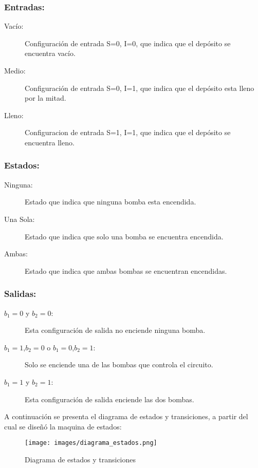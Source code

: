 \documentclass[10pt,a4paper]{article}
\begin{document}
\subsubsection*{Entradas:}

\begin{description}
\item[Vacío:] Configuración de entrada S=0, I=0, que indica que el depósito se encuentra vacío.
\item[Medio:] Configuración de entrada S=0, I=1, que indica que el depósito esta lleno por la mitad.
\item[Lleno:] Configuracion de entrada S=1, I=1, que indica que el depósito se encuentra lleno.
\end{description}

\subsubsection*{Estados:}

\begin{description}
\item[Ninguna:] Estado que indica que ninguna bomba esta encendida.
\item[Una Sola:] Estado que indica que solo una bomba se encuentra encendida.
\item[Ambas:] Estado que indica que ambas bombas se encuentran encendidas.
\end{description}

\subsubsection*{Salidas:}

\begin{description}
\item[$b_1=0$ y $b_2=0$:] Esta configuración de salida no enciende ninguna bomba.
\item[$b_1=1$,$b_2=0$ o $b_1=0$,$b_2=1$:] Solo se enciende una de las bombas que controla el circuito.
\item[$b_1=1$ y $b_2=1$:] Esta configuración de salida enciende las dos bombas.
\end{description}

A continuación se presenta el diagrama de estados y transiciones, a partir del cual se diseñó la maquina de estados:

\begin{figure}[H]
\centering
\texttt{[image: images/diagrama\_estados.png]}
\caption{Diagrama de estados y transiciones} \label{1_figa}
\end{figure}
\end{document}
